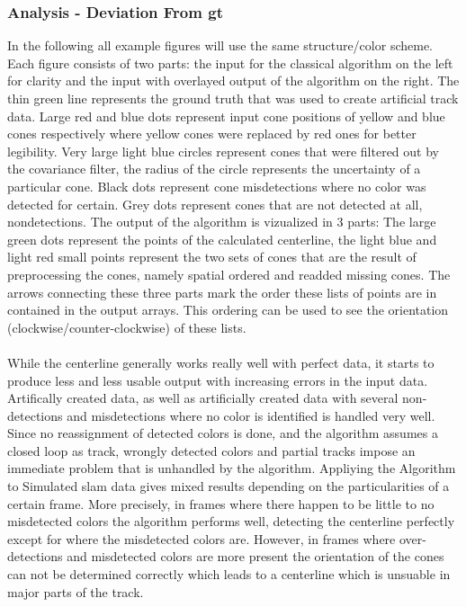 \subsubsection{Analysis - Deviation From \ac{gt}}
In the following all example figures will use the same structure/color scheme. Each figure consists of two parts: the input for the classical algorithm on the left for clarity and the input with overlayed output of the algorithm on the right. The thin green line represents the ground truth that was used to create artificial track data. Large red and blue dots represent input cone positions of yellow and blue cones respectively where yellow cones were replaced by red ones for better legibility. Very large light blue circles represent cones that were filtered out by the covariance filter, the radius of the circle represents the uncertainty of a particular cone. Black dots represent cone misdetections where no color was detected for certain. Grey dots represent cones that are not detected at all, nondetections. The output of the algorithm is vizualized in 3 parts: The large green dots represent the points of the calculated centerline, the light blue and light red small points represent the two sets of cones that are the result of preprocessing the cones, namely spatial ordered and readded missing cones. The arrows connecting these three parts mark the order these lists of points are in contained in the output arrays. This ordering can be used to see the orientation (clockwise/counter-clockwise) of these lists. \\ \\
While the centerline generally works really well with perfect data, it starts to produce less and less usable output with increasing errors in the input data. Artifically created data, as well as artificially created data with several non-detections and misdetections where no color is identified is handled very well. \\
Since no reassignment of detected colors is done, and the algorithm assumes a closed loop as track, wrongly detected colors and partial tracks impose an immediate problem that is unhandled by the algorithm.
Appliying the Algorithm to Simulated \ac{slam} data gives mixed results depending on the particularities of a certain frame. More precisely, in frames where there happen to be little to no misdetected colors the algorithm performs well, detecting the centerline perfectly except for where the misdetected colors are. However, in frames where over-detections and misdetected colors are more present the orientation of the cones can not be determined correctly which leads to a centerline which is unsuable in major parts of the track. 
